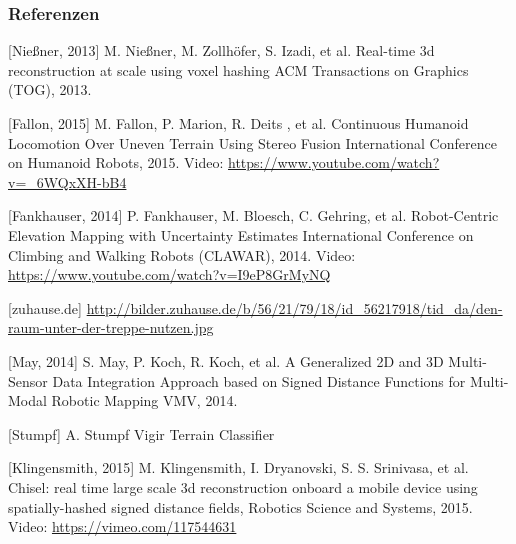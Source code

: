 \documentclass[accentcolor=tud1b,colorbacktitle,inverttitle,landscape,german,
presentation]{tudbeamer}
\begin{document}
\begin{frame}[allowframebreaks]
\frametitle{Referenzen}
\begin{thebibliography}{8}
[Nie{\ss}ner, 2013]
M. Nie{\ss}ner, M. Zollhöfer, S. Izadi, et al.
\newblock Real-time 3d reconstruction at scale using voxel hashing
\newblock ACM Transactions on Graphics (TOG), 2013.

[Fallon, 2015]
M. Fallon, P. Marion, R. Deits , et al.
\newblock Continuous Humanoid Locomotion Over Uneven Terrain Using Stereo Fusion
\newblock International Conference on Humanoid Robots, 2015.
\newblock Video: \small{\url{https://www.youtube.com/watch?v=_6WQxXH-bB4}}

[Fankhauser, 2014]
P. Fankhauser, M. Bloesch, C. Gehring, et al.
\newblock Robot-Centric Elevation Mapping with Uncertainty Estimates
\newblock International Conference on Climbing and Walking Robots (CLAWAR), 2014.
\newblock Video: \small{\url{https://www.youtube.com/watch?v=I9eP8GrMyNQ}}

[zuhause.de]
\newblock \small{ \url{http://bilder.zuhause.de/b/56/21/79/18/id_56217918/tid_da/den-raum-unter-der-treppe-nutzen.jpg}}

[May, 2014]
S. May, P. Koch, R. Koch, et al.
\newblock A Generalized 2D and 3D Multi-Sensor Data Integration Approach based on Signed Distance Functions for Multi-Modal Robotic Mapping
\newblock VMV, 2014.

[Stumpf]
A. Stumpf
\newblock Vigir Terrain Classifier

[Klingensmith, 2015]
M. Klingensmith, I. Dryanovski, S. S. Srinivasa, et al.
\newblock Chisel: real time large scale 3d reconstruction onboard a
mobile device using spatially-hashed signed distance fields,
\newblock Robotics Science and Systems, 2015.
\newblock Video: \small{\url{https://vimeo.com/117544631}}


\end{thebibliography}
\end{frame}
  
\end{document}
